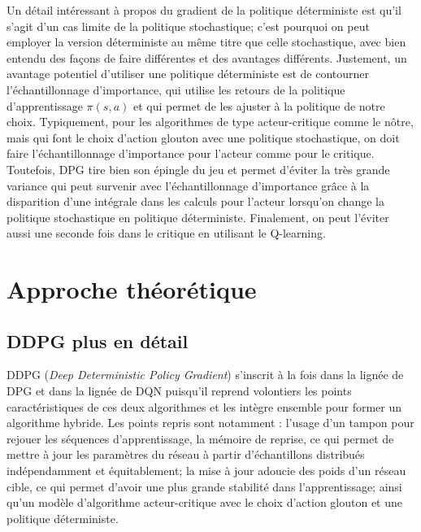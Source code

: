\documentclass[letterpaper, french]{article}
\begin{document}
Un détail intéressant à propos du gradient de la politique déterministe est qu'il s'agit d'un cas limite de la politique stochastique; c'est pourquoi on peut employer la version déterministe au même titre que celle stochastique, avec bien entendu des façons de faire différentes et des avantages différents. Justement, un avantage potentiel d'utiliser une politique déterministe est de contourner l'échantillonnage d'importance, qui utilise les retours de la politique d'apprentissage $\pi (s, a)$ et qui permet de les ajuster à la politique de notre choix. Typiquement, pour les algorithmes de type acteur-critique comme le nôtre, mais qui font le choix d'action glouton avec une politique stochastique, on doit faire l'échantillonnage d'importance pour l'acteur comme pour le critique. Toutefois, DPG tire bien son épingle du jeu et permet d'éviter la très grande variance qui peut survenir avec l'échantillonnage d'importance grâce à la disparition d'une intégrale dans les calculs pour l'acteur lorsqu'on change la politique stochastique en politique déterministe. Finalement, on peut l'éviter aussi une seconde fois dans le critique en utilisant le Q-learning.

\section{Approche théorétique}
\subsection{DDPG plus en détail}
DDPG (\textit{Deep Deterministic Policy Gradient}) s'inscrit à la fois dans la lignée de DPG et dans la lignée de DQN puisqu'il reprend volontiers les points caractéristiques de ces deux algorithmes et les intègre ensemble pour former un algorithme hybride. Les points repris sont notamment : l'usage d'un tampon pour rejouer les séquences d'apprentissage, la mémoire de reprise, ce qui permet de mettre à jour les paramètres du réseau à partir d'échantillons distribués indépendamment et équitablement; la mise à jour adoucie des poids d'un réseau cible, ce qui permet d'avoir une plus grande stabilité dans l'apprentissage; ainsi qu'un modèle d'algorithme acteur-critique avec le choix d'action glouton et une politique déterministe. \\
\end{document}
